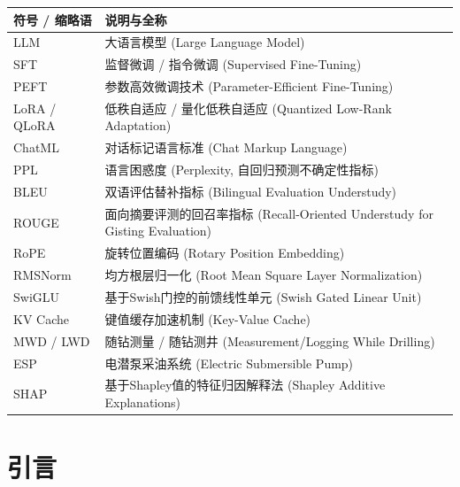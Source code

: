 \documentclass[UTF8,a4paper,zihao=-4,openany,twoside]{ctexbook}
\begin{document}
\begin{table}[htbp]
\centering
\begin{tabularx}{\textwidth}{lX}
\toprule
\textbf{符号 / 缩略语} & \textbf{说明与全称} \\
\midrule
LLM & 大语言模型 (Large Language Model) \\
SFT & 监督微调 / 指令微调 (Supervised Fine-Tuning) \\
PEFT & 参数高效微调技术 (Parameter-Efficient Fine-Tuning) \\
LoRA / QLoRA & 低秩自适应 / 量化低秩自适应 (Quantized Low-Rank Adaptation) \\
ChatML & 对话标记语言标准 (Chat Markup Language) \\
PPL & 语言困惑度 (Perplexity, 自回归预测不确定性指标) \\
BLEU & 双语评估替补指标 (Bilingual Evaluation Understudy) \\
ROUGE & 面向摘要评测的回召率指标 (Recall-Oriented Understudy for Gisting Evaluation) \\
RoPE & 旋转位置编码 (Rotary Position Embedding) \\
RMSNorm & 均方根层归一化 (Root Mean Square Layer Normalization) \\
SwiGLU & 基于Swish门控的前馈线性单元 (Swish Gated Linear Unit) \\
KV Cache & 键值缓存加速机制 (Key-Value Cache) \\
MWD / LWD & 随钻测量 / 随钻测井 (Measurement/Logging While Drilling) \\
ESP & 电潜泵采油系统 (Electric Submersible Pump) \\
SHAP & 基于Shapley值的特征归因解释法 (Shapley Additive Explanations) \\
\bottomrule
\end{tabularx}
\end{table}

\cleardoublepage

\mainmatter
{}

\chapter{引言}
\end{document}
